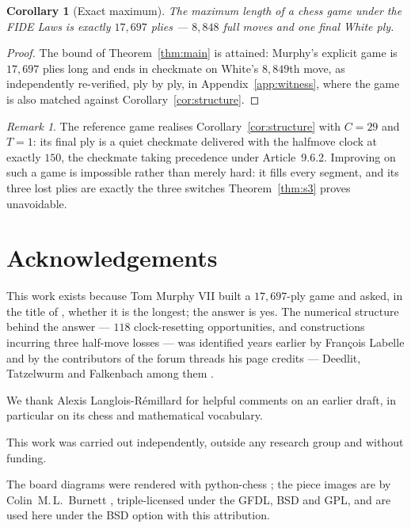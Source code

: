 \documentclass[11pt]{article}
\newtheorem{corollary}[theorem]{Corollary}
\theoremstyle{definition}
\theoremstyle{remark}
\newtheorem{remark}[theorem]{Remark}
\theoremstyle{plain}
\begin{document}
\begin{corollary}[Exact maximum]\label{cor:exact}
The maximum length of a chess game under the FIDE Laws is exactly
$17{,}697$ plies --- $8{,}848$ full moves and one final White ply.
\end{corollary}

\begin{proof}
The bound of Theorem~\ref{thm:main} is attained: Murphy's explicit game
\cite{murphy2020longest} is $17{,}697$ plies long and ends in checkmate
on White's $8{,}849$th move, as independently re-verified, ply by ply,
in Appendix~\ref{app:witness}, where the game is also matched against
Corollary~\ref{cor:structure}.
\end{proof}

\begin{remark}\label{rem:witnessprofile}
The reference game realises Corollary~\ref{cor:structure} with $C = 29$
and $T = 1$: its final ply is a quiet
checkmate delivered with the halfmove clock at exactly $150$, the
checkmate taking precedence under Article~9.6.2. Improving on such a game is
impossible rather than merely hard: it fills every segment, and its three
lost plies are exactly the three switches Theorem~\ref{thm:s3} proves
unavoidable.
\end{remark}

\section*{Acknowledgements}

This work exists because Tom Murphy VII built a $17{,}697$-ply game and
asked, in the title of \cite{murphy2020longest}, whether it is the
longest; the answer is yes. The numerical structure behind the answer
--- $118$ clock-resetting opportunities, and constructions incurring
three half-move losses --- was
identified years earlier by Fran\c{c}ois Labelle
\cite{labelle2015longest} and by the contributors of the forum threads
his page credits --- Deedlit, Tatzelwurm and Falkenbach among them
\cite{forum2011,forum2015}.

We thank Alexis Langlois-R\'emillard for helpful comments on an earlier
draft, in particular on its chess and mathematical vocabulary.

This work was carried out independently, outside any research group and
without funding.

The board diagrams were rendered with python-chess \cite{pythonchess};
the piece images are by Colin~M.\,L.~Burnett \cite{burnett-pieces},
triple-licensed under the GFDL, BSD and GPL, and are used here under the
BSD option with this attribution.
\end{document}
